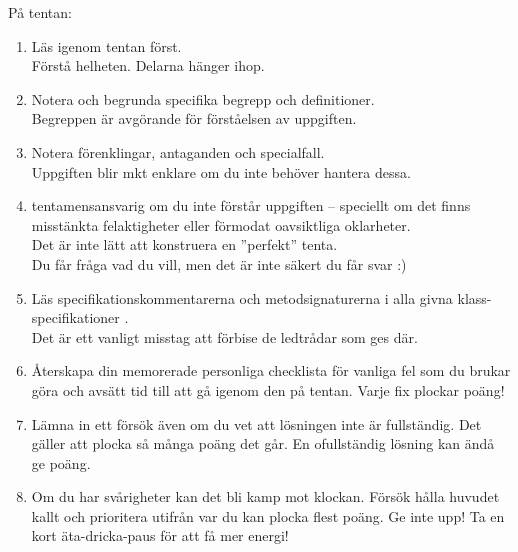 \begin{Slide}{På tentan:} \SlideFontTiny
\begin{enumerate}
\item Läs igenom  tentan först. \\  Förstå helheten. Delarna hänger ihop.
\item Notera och begrunda specifika begrepp och definitioner. \\  Begreppen är avgörande för förståelsen av uppgiften.
\item Notera förenklingar, antaganden och specialfall. \\  Uppgiften blir mkt enklare om du inte behöver hantera dessa.
\item {} tentamensansvarig om du inte förstår uppgiften -- speciellt om det finns misstänkta felaktigheter eller förmodat oavsiktliga oklarheter. \\  Det är inte lätt att konstruera en ''perfekt'' tenta. \\ Du får fråga vad du vill, men det är inte säkert du får svar :)
\item Läs specifikationskommentarerna och metodsignaturerna i alla givna klass-specifikationer . \\  Det är ett vanligt misstag att förbise de ledtrådar som ges där.
\item Återskapa din memorerade personliga checklista för vanliga fel som du brukar göra och avsätt tid till att gå igenom den på tentan. Varje fix plockar poäng!
\item Lämna in ett försök även om du vet att lösningen inte är fullständig. Det gäller att plocka så många poäng det går. En ofullständig lösning kan ändå ge poäng.

\item Om du har svårigheter kan det bli kamp mot klockan. Försök hålla huvudet kallt och prioritera utifrån var du kan plocka flest poäng. Ge inte upp! Ta en kort äta-dricka-paus för att få mer energi!

\end{enumerate}
\end{Slide}

\ifkompendium\else

